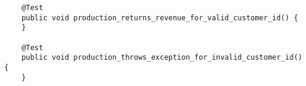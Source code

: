 \begin{verbatim}
    @Test
    public void production_returns_revenue_for_valid_customer_id() {
    }
    
    @Test
    public void production_throws_exception_for_invalid_customer_id() {
    }
\end{verbatim}